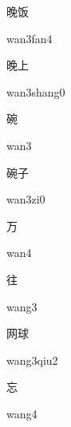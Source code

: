 \begin{verbete}{晚饭}
\begin{pronuncia}{wan3fan4}
\end{pronuncia}
\end{verbete}

\begin{verbete}{晚上}
\begin{pronuncia}{wan3shang0}
\end{pronuncia}
\end{verbete}

\begin{verbete}[wan3]{碗}
\begin{pronuncia}{wan3}
\end{pronuncia}
\end{verbete}

\begin{verbete}[wan3zi0]{碗子}
\begin{pronuncia}{wan3zi0}
\end{pronuncia}
\end{verbete}

\begin{verbete}[wan4]{万}
\begin{pronuncia}{wan4}
\end{pronuncia}
\end{verbete}

\begin{verbete}[wang3]{往}
\begin{pronuncia}{wang3}
\end{pronuncia}
\end{verbete}

\begin{verbete}{网球}
\begin{pronuncia}{wang3qiu2}
\end{pronuncia}
\end{verbete}

\begin{verbete}[wang4]{忘}
\begin{pronuncia}{wang4}
\end{pronuncia}
\end{verbete}

